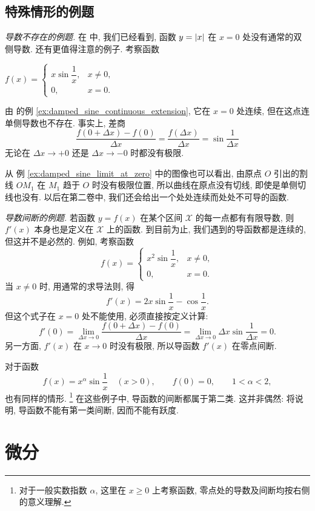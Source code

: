 \subsection{特殊情形的例题}\label{subsec:102}

\myrefparagraph{1\textdegree}\label{ex:continuous_without_derivative_at_zero}
\emph{导数不存在的例题.}
在  中, 我们已经看到, 函数 $y=\left| x \right|$ 在 $x=0$ 处没有通常的双侧导数.
还有更值得注意的例子. 考察函数
\begin{center}
$
f(x)=
\begin{cases}
x\sin\dfrac1x,&x\neq0,\\
0,&x=0.
\end{cases}
$
\end{center}
由  的例 \ref{ex:damped_sine_continuous_extension},
它在 $x=0$ 处连续, 但在这点连单侧导数也不存在.
事实上, 差商
$$
\frac{f(0+\Delta x)-f(0)}{\Delta x}
=\frac{f(\Delta x)}{\Delta x}=\sin\frac1{\Delta x}
$$
无论在 $\Delta x\to+0$ 还是 $\Delta x\to-0$ 时都没有极限.

从  例 \ref{ex:damped_sine_limit_at_zero} 中的图像也可以看出,
由原点 $O$ 引出的割线 $OM_1$ 在 $M_1$ 趋于 $O$ 时没有极限位置,
所以曲线在原点没有切线, 即使是单侧切线也没有.
以后在第二卷中, 我们还会给出一个处处连续而处处不可导的函数.

\myrefparagraph{2\textdegree}\label{ex:discontinuous_derivative}
\emph{导数间断的例题.}
若函数 $y=f(x)$ 在某个区间 $\mathcal{X}$ 的每一点都有有限导数,
则 $f'(x)$ 本身也是定义在 $\mathcal{X}$ 上的函数.
到目前为止, 我们遇到的导函数都是连续的, 但这并不是必然的.
例如, 考察函数
$$
f(x)=
\begin{cases}
x^2\sin\dfrac1x,&x\neq0,\\
0,&x=0.
\end{cases}
$$
当 $x\neq0$ 时, 用通常的求导法则, 得
$$
f'(x)=2x\sin\frac1x-\cos\frac1x.
$$
但这个式子在 $x=0$ 处不能使用, 必须直接按定义计算:
$$
f'(0)=\lim_{\Delta x\to0}\frac{f(0+\Delta x)-f(0)}{\Delta x}
=\lim_{\Delta x\to0}\Delta x\sin\frac1{\Delta x}=0.
$$
另一方面, $f'(x)$ 在 $x\to0$ 时没有极限,
所以导函数 $f'(x)$ 在零点间断.

对于函数
$$
f(x)=x^\alpha\sin\frac1x\quad(x>0),\qquad f(0)=0,
\qquad 1<\alpha<2,
$$
也有同样的情形.
\footnote{对于一般实数指数 $\alpha$, 这里在 $x\geq0$ 上考察函数,
零点处的导数及间断均按右侧的意义理解.}
在这些例子中, 导函数的间断都属于第二类.
这并非偶然:  将说明, 导函数不能有第一类间断, 因而不能有跃度.

\section{微分}\label{sec:differentials}

